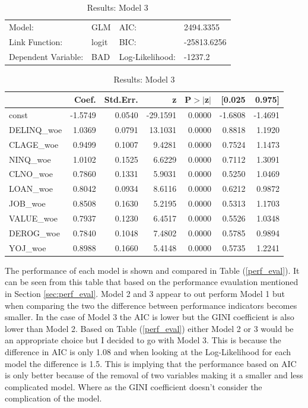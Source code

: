 \begin{table}
\renewcommand{\arraystretch}{1.25}
\begin{center}
\begin{tabular}{llll}
\hline
Model:              & GLM              & AIC:            & 2494.3355    \\
Link Function:      & logit            & BIC:            & -25813.6256  \\
Dependent Variable: & BAD              & Log-Likelihood: & -1237.2      \\
\hline
\end{tabular}
\end{center}
\begin{center}
\begin{tabular}{lrrrrrr}
\hline
            &  Coef.  & Std.Err. &    z     & P$> |$z$|$ &  [0.025 &  0.975]  \\
\hline
\hline
const       & -1.5749 &   0.0540 & -29.1591 &      0.0000 & -1.6808 & -1.4691  \\
DELINQ\_woe &  1.0369 &   0.0791 &  13.1031 &      0.0000 &  0.8818 &  1.1920  \\
CLAGE\_woe  &  0.9499 &   0.1007 &   9.4281 &      0.0000 &  0.7524 &  1.1473  \\
NINQ\_woe   &  1.0102 &   0.1525 &   6.6229 &      0.0000 &  0.7112 &  1.3091  \\
CLNO\_woe   &  0.7860 &   0.1331 &   5.9031 &      0.0000 &  0.5250 &  1.0469  \\
LOAN\_woe   &  0.8042 &   0.0934 &   8.6116 &      0.0000 &  0.6212 &  0.9872  \\
JOB\_woe    &  0.8508 &   0.1630 &   5.2195 &      0.0000 &  0.5313 &  1.1703  \\
VALUE\_woe  &  0.7937 &   0.1230 &   6.4517 &      0.0000 &  0.5526 &  1.0348  \\
DEROG\_woe  &  0.7840 &   0.1048 &   7.4802 &      0.0000 &  0.5785 &  0.9894  \\
YOJ\_woe    &  0.8988 &   0.1660 &   5.4148 &      0.0000 &  0.5735 &  1.2241  \\
\hline
\end{tabular}
\end{center}
\caption{Results: Model 3 \label{table:results_3}}
\end{table}

The performance of each model is shown and compared in Table (\ref{perf_eval}). It can be seen from this table that based on the performance evaulation mentioned in Section \ref{sec:perf_eval}. Model 2 and 3 appear to out perform Model 1 but when comparing the two the difference between performance indicators becomes smaller. In the case of Model 3 the AIC is lower but the GINI coefficient is also lower than Model 2. Based on Table (\ref{perf_eval}) either Model 2 or 3 would be an appropriate choice but I decided to go with Model 3. This is because the difference in AIC is only 1.08 and when looking at the Log-Likelihood for each model the difference is 1.5. This is implying that the performance based on AIC is only better because of the removal of two variables making it a smaller and less complicated model. Where as the GINI coefficient doesn't consider the complication of the model. \\

